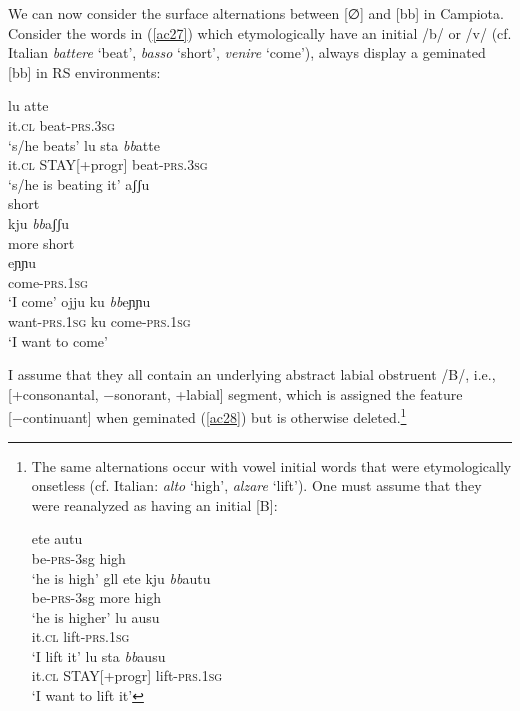\documentclass[output=paper]{langscibook}
\begin{document}
We can now consider the surface alternations between [∅] and [bb] in Campiota.  Consider the words in (\ref{ac27}) which etymologically have an initial /b/ or /v/ (cf. Italian \textit{battere} ‘beat’, \textit{basso} ‘short’, \textit{venire} ‘come’), always display a geminated [bb] in RS environments:

\ea\label{ac27}
    \ea\label{ac27a}
        \ea \label{ac27ai}\gll lu atte\\
            it.\textsc{cl} beat-\textsc{prs}.\textsc{3sg}\\
            \glt `s/he beats'
        \ex \label{ac27aii}\gll lu   sta     \textit{bb}atte\\
            it.\textsc{cl} STAY[+progr] beat-\textsc{prs}.\textsc{3sg}\\
            \glt `s/he is beating it'
        \z
    \ex\label{ac27b}
        \ea \label{ac27bi}\gll aʃʃu\\
                short\\
        \ex \label{ac27bii}\gll kju     \textit{bb}aʃʃu\\
                more    short\\
        \z
    \ex\label{ac27c}
        \ea \label{ac27ci}\gll eɲɲu\\
            come-\textsc{prs}.\textsc{1sg}\\
            \glt `I come'
        \ex \label{ac27cii}\gll ojju      ku   \textit{bb}eɲɲu\\
            want-\textsc{prs}.\textsc{1sg} ku   come-\textsc{prs}.\textsc{1sg}\\
            \glt `I want to come'
        \z
    \z
\z

I assume that they all contain an underlying abstract labial obstruent /B/, i.e., [+consonantal, −sonorant, +labial] segment, which is assigned the feature [−continuant] when geminated (\ref{ac28}) but is otherwise deleted.\footnote{The same alternations occur with vowel initial words that were etymologically onsetless (cf. Italian: \textit{alto} `high', \textit{alzare} `lift').  One must assume that they were reanalyzed as having an initial [B]:

\ea \label{fn14ex}
    \ea \label{fn14exa}
        \ea \label{fn14exai}\gll ete autu\\
            be-\textsc{prs}-3sg high\\
            \glt ‘he is high’
        \ex \label{fn14exaii}gll ete kju \textit{bb}autu\\
            be-\textsc{prs}-3sg more high\\
            \glt ‘he is higher’
        \z
    \ex \label{fn14exb}
        \ea \label{fn14exbi}\gll lu ausu\\
            it.\textsc{cl} lift-\textsc{prs}.\textsc{1sg}\\
            \glt ‘I lift it’
        \ex \label{fn14exbii}\gll lu sta \textit{bb}ausu\\
            it.\textsc{cl} STAY[+progr]  lift-\textsc{prs}.\textsc{1sg}\\
            \glt ‘I want to lift it’
        \z
    \z
\z

}
\end{document}
